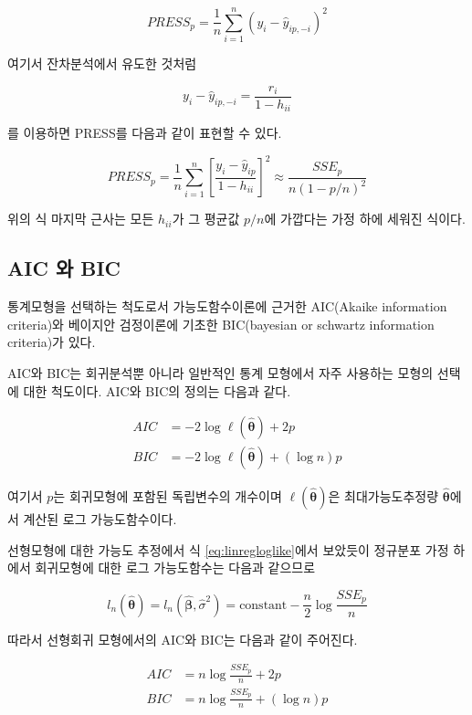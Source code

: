 \documentclass[
  10pt,
]{book}
\theoremstyle{definition}
\theoremstyle{definition}
\theoremstyle{definition}
\theoremstyle{definition}
\theoremstyle{remark}
\begin{document}
\begin{equation} 
 PRESS_p  = \frac{1}{n} \sum_{i=1}^n (y_i - \hat y_{ip,-i})^2 
 \label{eq:selpress}
 \end{equation}

여기서 잔차분석에서 유도한 것처럼

\[ y_i - \hat y_{ip,-i} = \frac{r_i}{1-h_{ii}} \]

를 이용하면 PRESS를 다음과 같이 표현할 수 있다.

\[ PRESS_p = \frac{1}{n} \sum_{i=1}^n  \left [ \frac{y_i - \hat y_{ip}}{1-h_{ii}} \right ]^2
\approx \frac{ SSE_p }{n(1-p/n)^2} \]

위의 식 마지막 근사는 모든 \(h_{ii}\)가 그 평균값 \(p/n\)에 가깝다는 가정 하에 세워진 식이다.

\hypertarget{aic-uxc640-bic}{%
\subsection{AIC 와 BIC}\label{aic-uxc640-bic}}

통계모형을 선택하는 척도로서 가능도함수이론에 근거한 AIC(Akaike information criteria)와 베이지안 검정이론에 기초한 BIC(bayesian or schwartz information criteria)가 있다.

AIC와 BIC는 회귀분석뿐 아니라 일반적인 통계 모형에서 자주 사용하는 모형의 선택에 대한 척도이다. AIC와 BIC의 정의는 다음과 같다.

\begin{align}
AIC &=  -2 \log \ell(\hat {\bm \theta}) + 2p   \label{eq:selbic}\\
BIC &=  -2 \log \ell(\hat {\bm \theta}) + (\log n) p \label{eq:selaic}
\end{align}

여기서 \(p\)는 회귀모형에 포함된 독립변수의 개수이며 \(\ell(\hat {\bm \theta})\)은 최대가능도추정량 \(\hat {\bm \theta}\)에서 계산된 로그 가능도함수이다.

선형모형에 대한 가능도 추정에서 식 \eqref{eq:linregloglike}에서 보았듯이 정규분포 가정 하에서 회귀모형에 대한 로그 가능도함수는 다음과 같으므로

\[
l_n(\hat { \bm \theta} ) = l_n(\hat { \bm \beta} ,\hat \sigma^2 ) 
= \text{constant}  - \frac{n}{2} \log \frac{SSE_p}{n} 
\]

따라서 선형회귀 모형에서의 AIC와 BIC는 다음과 같이 주어진다.

\begin{align*}
AIC &= n \log  \frac{SSE_p}{n} + 2p \\
BIC &= n \log  \frac{SSE_p}{n} + (\log n) p
\end{align*}
\end{document}
